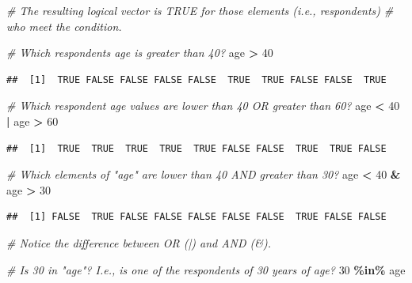 \documentclass[
]{book}
\newenvironment{Shaded}{\begin{snugshade}}{\end{snugshade}}
\newcommand{\CommentTok}[1]{\textcolor[rgb]{0.56,0.35,0.01}{\textit{#1}}}
\newcommand{\DecValTok}[1]{\textcolor[rgb]{0.00,0.00,0.81}{#1}}
\newcommand{\NormalTok}[1]{#1}
\newcommand{\SpecialCharTok}[1]{\textcolor[rgb]{0.81,0.36,0.00}{\textbf{#1}}}
\begin{document}
\begin{Shaded}
\begin{Highlighting}[]
\CommentTok{\# The resulting logical vector is TRUE for those elements (i.e., respondents)}
\CommentTok{\# who meet the condition.}

\CommentTok{\# Which respondent\textquotesingle{}s age is greater than 40?}
\NormalTok{age }\SpecialCharTok{\textgreater{}} \DecValTok{40}
\end{Highlighting}
\end{Shaded}

\begin{verbatim}
##  [1]  TRUE FALSE FALSE FALSE FALSE  TRUE  TRUE FALSE FALSE  TRUE
\end{verbatim}

\begin{Shaded}
\begin{Highlighting}[]
\CommentTok{\# Which respondent age values are lower than 40 OR greater than 60?}
\NormalTok{age }\SpecialCharTok{\textless{}} \DecValTok{40} \SpecialCharTok{|}\NormalTok{ age }\SpecialCharTok{\textgreater{}} \DecValTok{60}
\end{Highlighting}
\end{Shaded}

\begin{verbatim}
##  [1]  TRUE  TRUE  TRUE  TRUE  TRUE FALSE FALSE  TRUE  TRUE FALSE
\end{verbatim}

\begin{Shaded}
\begin{Highlighting}[]
\CommentTok{\# Which elements of "age" are lower than 40 AND greater than 30?}
\NormalTok{age }\SpecialCharTok{\textless{}} \DecValTok{40} \SpecialCharTok{\&}\NormalTok{ age }\SpecialCharTok{\textgreater{}} \DecValTok{30}
\end{Highlighting}
\end{Shaded}

\begin{verbatim}
##  [1] FALSE  TRUE FALSE FALSE FALSE FALSE FALSE  TRUE FALSE FALSE
\end{verbatim}

\begin{Shaded}
\begin{Highlighting}[]
\CommentTok{\# Notice the difference between OR (|) and AND (\&).}

\CommentTok{\# Is 30 in "age"? I.e., is one of the respondents of 30 years of age?}
\DecValTok{30} \SpecialCharTok{\%in\%}\NormalTok{ age}
\end{Highlighting}
\end{Shaded}
\end{document}
